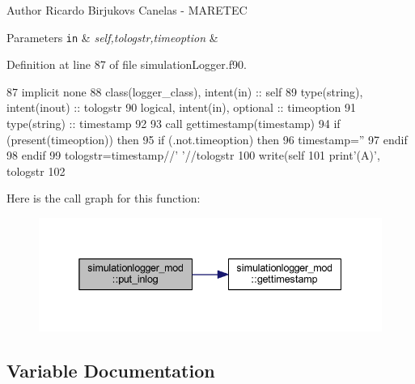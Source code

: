 \begin{DoxyAuthor}{Author}
Ricardo Birjukovs Canelas -\/ M\+A\+R\+E\+T\+EC 
\end{DoxyAuthor}

\begin{DoxyParams}[1]{Parameters}
\mbox{\tt in}  & {\em self,tologstr,timeoption} & \\
\hline
\end{DoxyParams}


Definition at line 87 of file simulation\+Logger.\+f90.


\begin{DoxyCode}
87     \textcolor{keywordtype}{implicit none}
88     \textcolor{keywordtype}{class}(logger\_class), \textcolor{keywordtype}{intent(in)} :: self
89     \textcolor{keywordtype}{type}(string), \textcolor{keywordtype}{intent(inout)} :: tologstr
90     \textcolor{keywordtype}{logical}, \textcolor{keywordtype}{intent(in)}, \textcolor{keywordtype}{optional} :: timeoption
91     \textcolor{keywordtype}{type}(string) :: timestamp
92 
93     \textcolor{keyword}{call }gettimestamp(timestamp)
94     \textcolor{keywordflow}{if} (\textcolor{keyword}{present}(timeoption)) \textcolor{keywordflow}{then}
95         \textcolor{keywordflow}{if} (.not.timeoption) \textcolor{keywordflow}{then}
96             timestamp=\textcolor{stringliteral}{''}
97 \textcolor{keywordflow}{        endif}
98 \textcolor{keywordflow}{    endif}
99     tologstr=timestamp//\textcolor{stringliteral}{' '}//tologstr
100     \textcolor{keyword}{write}(self%
101     print\textcolor{stringliteral}{'(A)'}, tologstr%
102 
\end{DoxyCode}
Here is the call graph for this function\+:\nopagebreak
\begin{figure}[H]
\begin{center}
\leavevmode
\includegraphics[width=338pt]{namespacesimulationlogger__mod_a3bf437b875b454ef326a3bc660542539_cgraph}
\end{center}
\end{figure}


\subsection{Variable Documentation}
\mbox{\label{namespacesimulationlogger__mod_a0d667ffec2a1129f89f4bd8fe6dc8a43}} 
